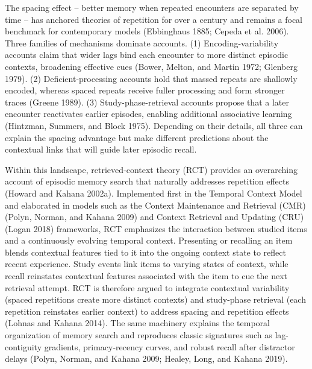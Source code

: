\documentclass[
  letterpaper,
  11pt,
  english,
  singlespacing,
  headsepline]{MastersDoctoralThesis}
\begin{document}
The spacing effect -- better memory when repeated encounters are
separated by time -- has anchored theories of repetition for over a
century and remains a focal benchmark for contemporary models
(Ebbinghaus 1885; Cepeda et al. 2006). Three families of mechanisms
dominate accounts. (1) Encoding-variability accounts claim that wider
lags bind each encounter to more distinct episodic contexts, broadening
effective cues (Bower, Melton, and Martin 1972; Glenberg 1979). (2)
Deficient-processing accounts hold that massed repeats are shallowly
encoded, whereas spaced repeats receive fuller processing and form
stronger traces (Greene 1989). (3) Study-phase-retrieval accounts
propose that a later encounter reactivates earlier episodes, enabling
additional associative learning (Hintzman, Summers, and Block 1975).
Depending on their details, all three can explain the spacing advantage
but make different predictions about the contextual links that will
guide later episodic recall.

Within this landscape, retrieved-context theory (RCT) provides an
overarching account of episodic memory search that naturally addresses
repetition effects (Howard and Kahana 2002a). Implemented first in the
Temporal Context Model and elaborated in models such as the Context
Maintenance and Retrieval (CMR) (Polyn, Norman, and Kahana 2009) and
Context Retrieval and Updating (CRU) (Logan 2018) frameworks, RCT
emphasizes the interaction between studied items and a continuously
evolving temporal context. Presenting or recalling an item blends
contextual features tied to it into the ongoing context state to reflect
recent experience. Study events link items to varying states of context,
while recall reinstates contextual features associated with the item to
cue the next retrieval attempt. RCT is therefore argued to integrate
contextual variability (spaced repetitions create more distinct
contexts) and study-phase retrieval (each repetition reinstates earlier
context) to address spacing and repetition effects (Lohnas and Kahana
2014). The same machinery explains the temporal organization of memory
search and reproduces classic signatures such as lag-contiguity
gradients, primacy-recency curves, and robust recall after distractor
delays (Polyn, Norman, and Kahana 2009; Healey, Long, and Kahana 2019).
\end{document}
